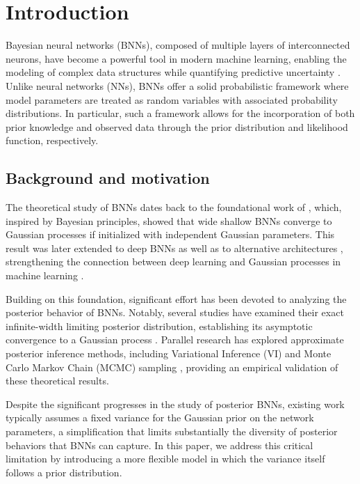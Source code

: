 \section{Introduction} \label{sec:intro}

Bayesian neural networks (BNNs), composed of multiple layers of interconnected neurons, have become a powerful tool in modern machine learning, enabling the modeling of complex data structures while quantifying predictive uncertainty \citep{neal1996}. Unlike neural networks (NNs), BNNs offer a solid probabilistic framework where model parameters are treated as random variables with associated probability distributions. In particular, such a framework allows for the incorporation of both prior knowledge and observed data through the prior distribution and likelihood function, respectively.

\subsection{Background and motivation}

The theoretical study of BNNs dates back to the foundational work of \citet{neal1996}, which, inspired by Bayesian principles, showed that wide shallow BNNs converge to Gaussian processes if initialized with independent Gaussian parameters. 
This result was later extended to deep BNNs  \citep{matthews2018,lee2018,basteri2022,favaro2024} as well as to alternative architectures \citep{novak2020,yang2021}, strengthening the connection between deep learning and Gaussian processes in machine learning \citep{gp2006}.

Building on this foundation, significant effort has been devoted to analyzing the posterior behavior of BNNs. Notably, several studies have examined their exact infinite-width limiting posterior distribution, establishing its asymptotic convergence to a Gaussian process \citep{hron2020,trevisan2023}. Parallel research has explored approximate posterior inference methods, including Variational Inference (VI) \citep{blundell2015} and Monte Carlo Markov Chain (MCMC) sampling \citep{izmailov2021,pezzetti2024}, providing an empirical validation of these theoretical results.

Despite the significant progresses in the study of posterior BNNs, existing work typically assumes a fixed variance for the Gaussian prior on the network parameters, a simplification that limits substantially the diversity of posterior behaviors that BNNs can capture. In this paper, we address this critical  limitation by introducing a more flexible model in which the variance itself follows a prior distribution.

